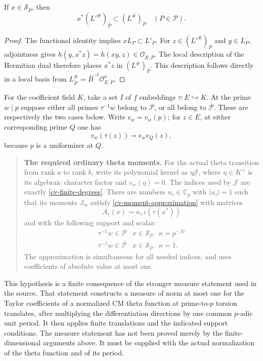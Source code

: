 \begin{lemma}\label{cv-support-duality}
If $x\in\mathscr S_{\bar P}$, then
\[
               x^*(L'^\#)_{\bar P}\subset(L^\#)_{\bar P}
                          \quad(P\in\mathcal P).
 \tag{CV7}
\]
\end{lemma}
\begin{proof}
The functional identity implies $xL_P\subset L'_P$.  For
$z\in(L'^\#)_{\bar P}$ and $y\in L_P$, adjointness gives
$h(y,x^*z)=h(xy,z)\in\mathcal O_{E,\bar P}$.
The local description of the Hermitian dual therefore places
$x^*z$ in $(L^\#)_{\bar P}$.  This description follows directly
in a local basis from $L^\#_{\bar P}=\bar B^{-t}
\mathcal O_{E,\bar P}^a$.
\end{proof}

For the coefficient field $K$, take a set $I$ of $f$ embeddings
$\tau:E\hookrightarrow K$.  At the prime $w\mid p$ suppose either
all primes $\tau^{-1}w$ belong to $\mathcal P$, or all belong to
$\overline{\mathcal P}$.  These are respectively the two cases
below.  Write $e_w=v_w(p)$; for $z\in E$, at either corresponding
prime $Q$ one has
\[
                         v_w(\tau(z))=e_wv_Q(z),
 \tag{CV8}
\]
because $p$ is a uniformizer at $Q$.

\begin{quote}
\textbf{The required ordinary theta moments.}
\label{cv-theta-moments}
For the actual theta transition from rank $a$ to rank $b$, write its
polynomial kernel as $\eta\mathcal J$, where
$\eta\in K^\times$ is its algebraic character factor and
$v_w(\eta)=0$.  The indices used by $\mathcal J$ are exactly
\eqref{cv-finite-degrees}.  There are numbers
$u_\tau\in\mathbb C_p$ with $|u_\tau|=1$ such that its moments
$J_m$ satisfy \eqref{cv-moment-approximation} with matrices
\[
                         A_\tau(x)=u_\tau\,\iota(\tau(x^*))
 \tag{CV9}
\]
and with the following support and scalar:
\[
 \begin{array}{c|c|c}
 \tau^{-1}w\in\mathcal P&x\in\mathscr S_P&\kappa=p^{-fa}\\
 \tau^{-1}w\in\overline{\mathcal P}&x\in\mathscr S_{\bar P}
                                                  &\kappa=1.
 \end{array}
 \tag{CV10}
\]
The approximation is simultaneous for all needed indices, and uses
coefficients of absolute value at most one.
\end{quote}

This hypothesis is a finite consequence of the stronger measure
statement used in the source.  That statement constructs a measure
of norm at most one for the Taylor coefficients of a normalized CM
theta function at prime-to-$p$ torsion translates, after multiplying
the differentiation directions by one common $p$-adic unit period.
It then applies finite translations and the indicated support
conditions.  The measure statement has not been proved merely by
the finite-dimensional arguments above.  It must be supplied with
the actual normalization of the theta function and of its period.

